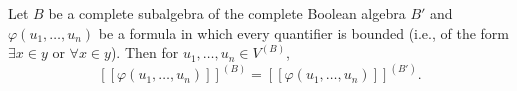 Let $B$ be a complete subalgebra of the complete Boolean algebra $B'$ and $\varphi(u_1, \ldots, u_n)$ be a formula in which every quantifier is bounded (i.e., of the form $\exists x \in y$ or $\forall x \in y$). Then for $u_1, \ldots, u_n \in V^{(B)}$,
$$[\![\varphi(u_1, \ldots, u_n)]\!]^{(B)} = [\![\varphi(u_1, \ldots, u_n)]\!]^{(B')}.$$
